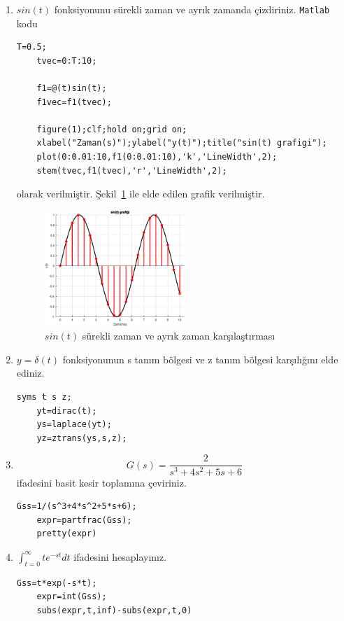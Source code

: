 \begin{enumerate}
    \item $sin(t)$ fonksiyonunu sürekli zaman ve ayrık zamanda çizdiriniz.
    \verb|Matlab| kodu
    \begin{lstlisting}[style=Matlab-editor]
    T=0.5;
    tvec=0:T:10;

    f1=@(t)sin(t);
    f1vec=f1(tvec);

    figure(1);clf;hold on;grid on;
    xlabel("Zaman(s)");ylabel("y(t)");title("sin(t) grafigi");
    plot(0:0.01:10,f1(0:0.01:10),'k','LineWidth',2);
    stem(tvec,f1(tvec),'r','LineWidth',2);
    \end{lstlisting}
    olarak verilmiştir. Şekil~\ref{fig:lec5_plot1} ile elde edilen grafik verilmiştir.
    \begin{figure}[!htb]
        \centering
        \includegraphics[width=0.5\textwidth]{img/lec5_plot1}
        \caption{$sin(t)$ sürekli zaman ve ayrık zaman karşılaştırması}
        \label{fig:lec5_plot1}
    \end{figure}
    \item $y=\delta(t)$ fonksiyonunun s tanım bölgesi ve z tanım bölgesi karşılığını elde ediniz.
    \begin{lstlisting}[style=Matlab-editor]
    syms t s z;
    yt=dirac(t);
    ys=laplace(yt);
    yz=ztrans(ys,s,z);
    \end{lstlisting}
    \item 
    \begin{equation}
        G(s)=\frac{2}{s^3+4s^2+5s+6}
    \end{equation}
    ifadesini basit kesir toplamına çeviriniz.
    \begin{lstlisting}[style=Matlab-editor]
    Gss=1/(s^3+4*s^2+5*s+6);
    expr=partfrac(Gss);
    pretty(expr)
    \end{lstlisting}
    \item $\int_{t=0}^{\infty} te^{-st}dt$ ifadesini hesaplayınız.
    \begin{lstlisting}[style=Matlab-editor]
    Gss=t*exp(-s*t);
    expr=int(Gss);
    subs(expr,t,inf)-subs(expr,t,0)
    \end{lstlisting}
\end{enumerate}